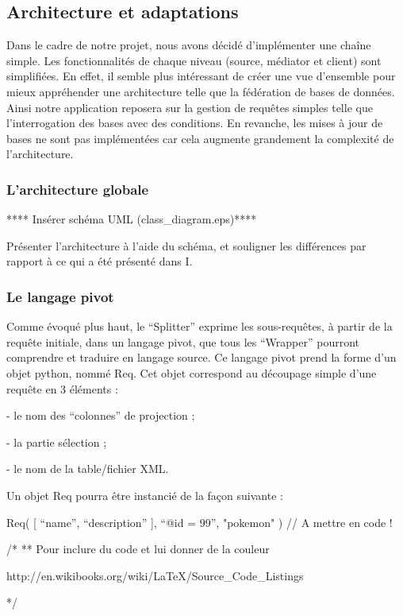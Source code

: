 \subsection{Architecture et adaptations}

Dans le cadre de notre projet, nous avons décidé d’implémenter une chaîne simple. Les fonctionnalités de chaque niveau (source, médiator et client) sont simplifiées. En effet, il semble plus intéressant de créer une vue d’ensemble pour mieux appréhender une architecture telle que la fédération de bases de données. Ainsi notre application reposera sur la gestion de requêtes simples telle que l’interrogation des bases avec des conditions. En revanche, les mises à jour de bases ne sont pas implémentées car cela augmente grandement la complexité de l’architecture.

\subsubsection{L’architecture globale}

**** Insérer schéma UML (class_diagram.eps)****

Présenter l’architecture à l’aide du schéma, et souligner les différences par rapport à ce qui a été présenté dans I.

\subsubsection{Le langage pivot}

Comme évoqué plus haut, le “Splitter” exprime les sous-requêtes, à partir de la requête initiale, dans un langage pivot, que tous les “Wrapper” pourront comprendre et traduire en langage source. Ce langage pivot prend la forme d’un objet python, nommé Req. Cet objet correspond au découpage simple d’une requête en 3 éléments :

    - le nom des “colonnes” de projection ;

    - la partie sélection ;

    - le nom de la table/fichier XML.


Un objet Req pourra être instancié de la façon suivante :

Req( [ “name”, “description” ], “@id = 99”, "pokemon" ) // A mettre en code !

/* ** Pour inclure du code et lui donner de la couleur

http://en.wikibooks.org/wiki/LaTeX/Source_Code_Listings

*/

